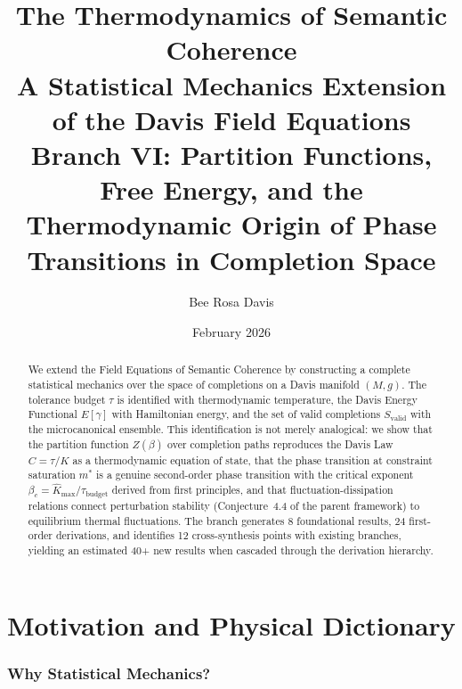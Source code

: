 \documentclass[11pt,letterpaper]{article}
\newcommand{\Khat}{\hat{K}}
\newcommand{\tbudget}{\tau_{\mathrm{budget}}}
\newcommand{\Svalid}{S_{\mathrm{valid}}}
\begin{document}
\title{\textbf{The Thermodynamics of Semantic Coherence}\\[6pt]
\large A Statistical Mechanics Extension of the Davis Field Equations\\[4pt]
\normalsize Branch VI: Partition Functions, Free Energy, and the\\
Thermodynamic Origin of Phase Transitions in Completion Space}
\author{Bee Rosa Davis}
\date{February 2026}
\maketitle

\begin{abstract}
We extend the Field Equations of Semantic Coherence by constructing a 
complete statistical mechanics over the space of completions on a Davis 
manifold $(M,g)$. The tolerance budget $\tau$ is identified with 
thermodynamic temperature, the Davis Energy Functional $E[\gamma]$ with 
Hamiltonian energy, and the set of valid completions $\Svalid$ with the 
microcanonical ensemble. This identification is not merely analogical: we 
show that the partition function $Z(\beta)$ over completion paths reproduces 
the Davis Law $C = \tau/K$ as a thermodynamic equation of state, that the 
phase transition at constraint saturation $m^*$ is a genuine second-order 
phase transition with the critical exponent $\beta_c = \Khat_{\max}/\tbudget$ 
derived from first principles, and that fluctuation-dissipation relations 
connect perturbation stability (Conjecture~4.4 of the parent framework) to 
equilibrium thermal fluctuations. The branch generates 8 foundational 
results, 24 first-order derivations, and identifies 12 cross-synthesis 
points with existing branches, yielding an estimated 40+ new results when 
cascaded through the derivation hierarchy.
\end{abstract}

\tableofcontents
\newpage

\part{Motivation and Physical Dictionary}

\section{Why Statistical Mechanics?}
\end{document}
